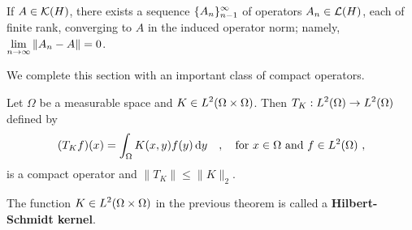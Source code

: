\begin{theorem}
If $A \in \mathcal{K}(H)$, there exists a sequence
$\displaystyle \{A_n\}_{n-1}^\infty$ of
operators $A_n \in \mathcal{L}(H)$, each of finite rank, converging to $A$ in
the induced operator norm; namely,
$\displaystyle \lim_{n\rightarrow \infty} \|A_n-A\| = 0$.
\end{theorem}

We complete this section with an important class of compact operators.

\begin{theorem} \label{fu_an_HSKern}
Let $\Omega$ be a measurable space and
$\displaystyle K \in L^2(\Omega\times \Omega)$.  Then
$\displaystyle T_K:L^2(\Omega)\rightarrow L^2(\Omega)$ defined by
\[
(T_K f)(x) = \int_{\Omega} K(x,y) f(y) \,\mathrm{d}{y} \quad ,
\quad \text{for}\ x \in \Omega
\ \text{and} \ f \in L^2(\Omega) \ ,
\]
is a compact operator and $\|T_K\| \leq \|K\|_2$.
\end{theorem}

The function $\displaystyle K \in L^2(\Omega\times \Omega)$ in the
previous theorem is called a
{\bfseries Hilbert-Schmidt kernel}. 

